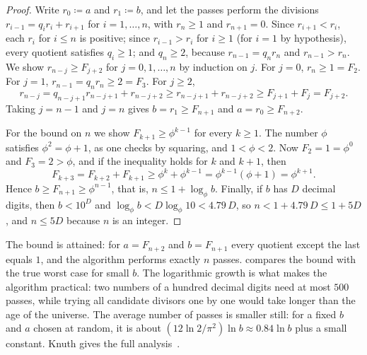 \begin{proof}
Write $r_0\coloneqq a$ and $r_1\coloneqq b$, and let the passes perform the divisions $r_{i-1}=q_ir_i+r_{i+1}$ for $i=1,\ldots,n$, with $r_n\ge1$ and $r_{n+1}=0$. Since $r_{i+1}<r_i$, each $r_i$ for $i\le n$ is positive; since $r_{i-1}>r_i$ for $i\ge1$ (for $i=1$ by hypothesis), every quotient satisfies $q_i\ge1$; and $q_n\ge2$, because $r_{n-1}=q_nr_n$ and $r_{n-1}>r_n$. We show $r_{n-j}\ge F_{j+2}$ for $j=0,1,\ldots,n$ by induction on $j$. For $j=0$, $r_n\ge1=F_2$. For $j=1$, $r_{n-1}=q_nr_n\ge2=F_3$. For $j\ge2$,
\[
r_{n-j}=q_{n-j+1}r_{n-j+1}+r_{n-j+2}\ge r_{n-j+1}+r_{n-j+2}\ge F_{j+1}+F_j=F_{j+2}.
\]
Taking $j=n-1$ and $j=n$ gives $b=r_1\ge F_{n+1}$ and $a=r_0\ge F_{n+2}$.

For the bound on $n$ we show $F_{k+1}\ge\phi^{k-1}$ for every $k\ge1$. The number $\phi$ satisfies $\phi^2=\phi+1$, as one checks by squaring, and $1<\phi<2$. Now $F_2=1=\phi^0$ and $F_3=2>\phi$, and if the inequality holds for $k$ and $k+1$, then
\[
F_{k+3}=F_{k+2}+F_{k+1}\ge\phi^k+\phi^{k-1}=\phi^{k-1}(\phi+1)=\phi^{k+1}.
\]
Hence $b\ge F_{n+1}\ge\phi^{n-1}$, that is, $n\le1+\log_\phi b$. Finally, if $b$ has $D$ decimal digits, then $b<10^D$ and $\log_\phi b<D\log_\phi10<4.79\,D$, so $n<1+4.79\,D\le1+5D$, and $n\le5D$ because $n$ is an integer.
\end{proof}

The bound is attained: for $a=F_{n+2}$ and $b=F_{n+1}$ every quotient except the last equals $1$, and the algorithm performs exactly $n$ passes.  compares the bound with the true worst case for small $b$. The logarithmic growth is what makes the algorithm practical: two numbers of a hundred decimal digits need at most $500$ passes, while trying all candidate divisors one by one would take longer than the age of the universe. The average number of passes is smaller still: for a fixed $b$ and $a$ chosen at random, it is about $(12\ln2/\pi^2)\ln b\approx0.84\ln b$ plus a small constant. Knuth gives the full analysis~\cite[Sect.~4.5.3]{knuth1997taocp2}.


